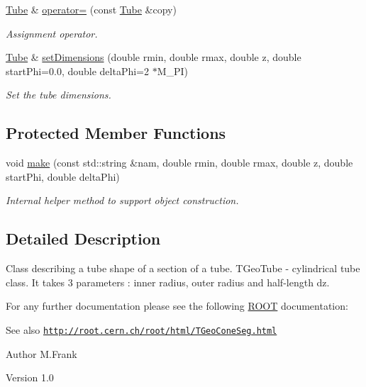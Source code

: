 \begin{DoxyCompactItemize}
\hyperlink{class_d_d4hep_1_1_geometry_1_1_tube}{Tube} \& \hyperlink{class_d_d4hep_1_1_geometry_1_1_tube_adcf1ecd48e6edfd48c19492d4b4dd049}{operator=} (const \hyperlink{class_d_d4hep_1_1_geometry_1_1_tube}{Tube} \&copy)
\begin{DoxyCompactList}\small\item\em Assignment operator. \item\end{DoxyCompactList}\item 
\hyperlink{class_d_d4hep_1_1_geometry_1_1_tube}{Tube} \& \hyperlink{class_d_d4hep_1_1_geometry_1_1_tube_aa1a2e428c08cbd8c7b2e89cc4950a0a1}{setDimensions} (double rmin, double rmax, double z, double startPhi=0.0, double deltaPhi=2 $\ast$M\_\-PI)
\begin{DoxyCompactList}\small\item\em Set the tube dimensions. \item\end{DoxyCompactList}\end{DoxyCompactItemize}
\subsection*{Protected Member Functions}
\begin{DoxyCompactItemize}
\item 
void \hyperlink{class_d_d4hep_1_1_geometry_1_1_tube_a3ad80b0f21855572872ad3629a577599}{make} (const std::string \&nam, double rmin, double rmax, double z, double startPhi, double deltaPhi)
\begin{DoxyCompactList}\small\item\em Internal helper method to support object construction. \item\end{DoxyCompactList}\end{DoxyCompactItemize}


\subsection{Detailed Description}
Class describing a tube shape of a section of a tube. TGeoTube -\/ cylindrical tube class. It takes 3 parameters : inner radius, outer radius and half-\/length dz.

For any further documentation please see the following \hyperlink{namespace_r_o_o_t}{ROOT} documentation: \begin{DoxySeeAlso}{See also}
\href{http://root.cern.ch/root/html/TGeoConeSeg.html}{\tt http://root.cern.ch/root/html/TGeoConeSeg.html}
\end{DoxySeeAlso}
\begin{DoxyAuthor}{Author}
M.Frank 
\end{DoxyAuthor}
\begin{DoxyVersion}{Version}
1.0 
\end{DoxyVersion}



